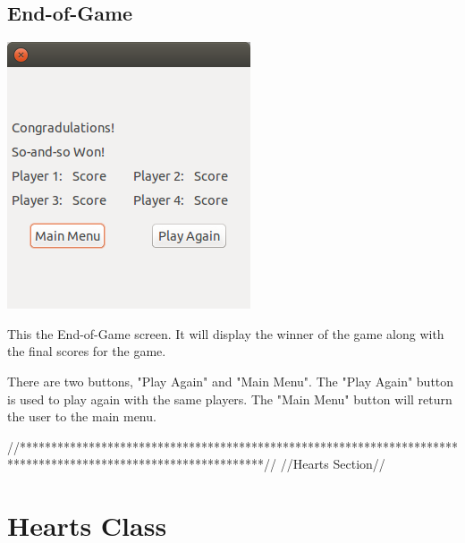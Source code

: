 \documentclass[]{scrartcl}
\begin{document}
\subsection{End-of-Game}
\centerline{\includegraphics{end_game.png}}
This the End-of-Game screen. It will display the winner of the game along with the final scores for the game.

 There are two buttons, "Play Again" and "Main Menu". The "Play Again" button is used to play again with the same players. The "Main Menu" button will return the user to the main menu.

//***************************************************************************************************************//
//Hearts Section//
 \noindent{}

 \section{Hearts Class}
\end{document}
